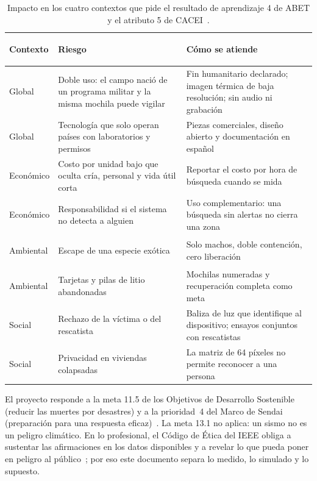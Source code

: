 \begin{table}[H]
\centering\footnotesize
\caption{Impacto en los cuatro contextos que pide el resultado de aprendizaje 4 de ABET y el atributo 5 de
CACEI~\cite{abet,cacei}.}
\label{tab:impacto}
\begin{tabularx}{\textwidth}{@{}>{\bfseries\raggedright\arraybackslash}p{1.9cm} >{\raggedright\arraybackslash}X >{\raggedright\arraybackslash}X@{}}
\toprule
\rowcolor{TableHead} Contexto & Riesgo & Cómo se atiende \\
\midrule
Global & Doble uso: el campo nació de un programa militar y la misma mochila puede vigilar & Fin humanitario declarado; imagen térmica de baja resolución; sin audio ni grabación \\
Global & Tecnología que solo operan países con laboratorios y permisos & Piezas comerciales, diseño abierto y documentación en español \\
Económico & Costo por unidad bajo que oculta cría, personal y vida útil corta & Reportar el costo por hora de búsqueda cuando se mida \\
Económico & Responsabilidad si el sistema no detecta a alguien & Uso complementario: una búsqueda sin alertas no cierra una zona \\
Ambiental & Escape de una especie exótica & Solo machos, doble contención, cero liberación \\
Ambiental & Tarjetas y pilas de litio abandonadas & Mochilas numeradas y recuperación completa como meta \\
Social & Rechazo de la víctima o del rescatista & Baliza de luz que identifique al dispositivo; ensayos conjuntos con rescatistas \\
Social & Privacidad en viviendas colapsadas & La matriz de 64 píxeles no permite reconocer a una persona \\
\bottomrule
\end{tabularx}
\end{table}

El proyecto responde a la meta 11.5 de los Objetivos de Desarrollo Sostenible (reducir las muertes
por desastres) y a la prioridad~4 del Marco de Sendai (preparación para una respuesta
eficaz)~\cite{ods,sendai}. La meta 13.1 no aplica: un sismo no es un peligro climático. En lo
profesional, el Código de Ética del IEEE obliga a sustentar las afirmaciones en los datos disponibles y a
revelar lo que pueda poner en peligro al público~\cite{ieeecode}; por eso este documento separa lo medido,
lo simulado y lo supuesto.
